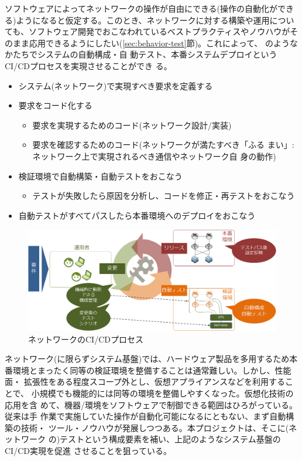 ソフトウェアによってネットワークの操作が自由にできる(操作の自動化ができ
る)ようになると仮定する。このとき、ネットワークに対する構築や運用につい
ても、ソフトウェア開発でおこなわれているベストプラクティスやノウハウがそ
のまま応用できるようにしたい(\ref{sec:behavior-test}節)。これによって、
のようなかたちでシステムの自動構成・自
動テスト、本番システムデプロイというCI/CDプロセスを実現させることができ
る。
\begin{itemize}
 \item システム(ネットワーク)で実現すべき要求を定義する
 \item 要求をコード化する
       \begin{itemize}
        \item 要求を実現するためのコード(ネットワーク設計/実装)
        \item 要求を確認するためのコード(ネットワークが満たすべき「ふる
              まい」: ネットワーク上で実現されるべき通信やネットワーク自
              身の動作)
       \end{itemize}
 \item 検証環境で自動構築・自動テストをおこなう
       \begin{itemize}
        \item テストが失敗したら原因を分析し、コードを修正・再テストをおこなう
       \end{itemize}
 \item 自動テストがすべてパスしたら本番環境へのデプロイをおこなう
\end{itemize}

\begin{figure}[h]
 \centering
 \includegraphics[scale=0.5]{img/desired-cicd-process.png}
 \caption{ネットワークのCI/CDプロセス}
 \label{fig:desired-cicd-process}
\end{figure}

ネットワーク(に限らずシステム基盤)では、ハードウェア製品を多用するため本
番環境とまったく同等の検証環境を整備することは通常難しい。しかし、性能面・
拡張性をある程度スコープ外とし、仮想アプライアンスなどを利用することで、
小規模でも機能的には同等の環境を整備しやすくなった。仮想化技術の応用を含
めて、機器/環境をソフトウェアで制御できる範囲はひろがっている。従来は手
作業で実施していた操作が自動化可能になるにともない、まず自動構築の技術・
ツール・ノウハウが発展しつつある。本プロジェクトは、そこに(ネットワーク
の)テストという構成要素を補い、上記のようなシステム基盤のCI/CD実現を促進
させることを狙っている。

